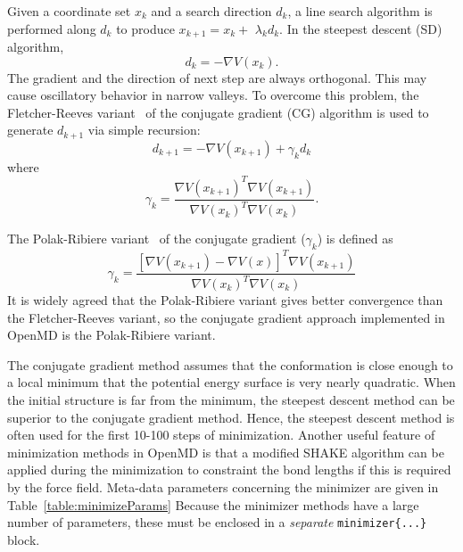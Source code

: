 \documentclass[letterpaper]{report}
\begin{document}
Given a coordinate set $x_{k}$ and a search direction $d_{k}$, a line
search algorithm is performed along $d_{k}$ to produce
$x_{k+1}=x_{k}+$ $\lambda _{k}d_{k}$. In the steepest descent (SD) algorithm,
\begin{equation}
d_{k}=-\nabla V(x_{k}).
\end{equation}
The gradient and the direction of next step are always orthogonal.
This may cause oscillatory behavior in narrow valleys.  To overcome
this problem, the Fletcher-Reeves variant~\cite{FletcherReeves} of the
conjugate gradient (CG) algorithm is used to generate $d_{k+1}$
via simple recursion:
\begin{equation}
d_{k+1}  =-\nabla V(x_{k+1})+\gamma_{k}d_{k}
\end{equation}
where
\begin{equation}
\gamma_{k}  =\frac{\nabla V(x_{k+1})^{T}\nabla V(x_{k+1})}{\nabla
V(x_{k})^{T}\nabla V(x_{k})}.
\end{equation}

The Polak-Ribiere variant~\cite{PolakRibiere} of the conjugate
gradient ($\gamma_{k}$) is defined as%
\begin{equation}
\gamma_{k}=\frac{[\nabla V(x_{k+1})-\nabla V(x)]^{T}\nabla V(x_{k+1})}{\nabla
V(x_{k})^{T}\nabla V(x_{k})}%
\end{equation}
It is widely agreed that the Polak-Ribiere variant gives better
convergence than the Fletcher-Reeves variant, so the conjugate
gradient approach implemented in OpenMD is the Polak-Ribiere
variant.

The conjugate gradient method assumes that the conformation is close
enough to a local minimum that the potential energy surface is very
nearly quadratic.  When the initial structure is far from the minimum,
the steepest descent method can be superior to the conjugate gradient
method. Hence, the steepest descent method is often used for the first
10-100 steps of minimization. Another useful feature of minimization
methods in OpenMD is that a modified SHAKE algorithm can
be applied during the minimization to constraint the bond lengths if
this is required by the force field. Meta-data parameters concerning
the minimizer are given in Table~\ref{table:minimizeParams} Because
the minimizer methods have a large number of parameters, these must be
enclosed in a {\it separate} {\tt minimizer\{...\}} block.
\end{document}
